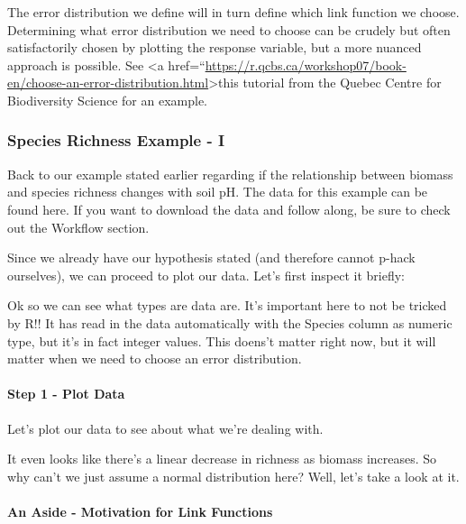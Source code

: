 \documentclass[
]{article}
\begin{document}
The error distribution we define will in turn define which link function
we choose. Determining what error distribution we need to choose can be
crudely but often satisfactorily chosen by plotting the response
variable, but a more nuanced approach is possible. See \textless a
href=``\url{https://r.qcbs.ca/workshop07/book-en/choose-an-error-distribution.html}\textgreater this
tutorial from the Quebec Centre for Biodiversity Science for an example.

\hypertarget{species-richness-example---i}{%
\subsubsection{Species Richness Example -
I}\label{species-richness-example---i}}

Back to our example stated earlier regarding if the relationship between
biomass and species richness changes with soil pH. The data for this
example can be found here. If you want to download the data and follow
along, be sure to check out the Workflow section.

Since we already have our hypothesis stated (and therefore cannot p-hack
ourselves), we can proceed to plot our data. Let's first inspect it
briefly:

Ok so we can see what types are data are. It's important here to not be
tricked by R!! It has read in the data automatically with the Species
column as numeric type, but it's in fact integer values. This doens't
matter right now, but it will matter when we need to choose an error
distribution.

\hypertarget{step-1---plot-data}{%
\paragraph{Step 1 - Plot Data}\label{step-1---plot-data}}

Let's plot our data to see about what we're dealing with.

It even looks like there's a linear decrease in richness as biomass
increases. So why can't we just assume a normal distribution here? Well,
let's take a look at it.

\hypertarget{an-aside---motivation-for-link-functions}{%
\paragraph{An Aside - Motivation for Link
Functions}\label{an-aside---motivation-for-link-functions}}
\end{document}
